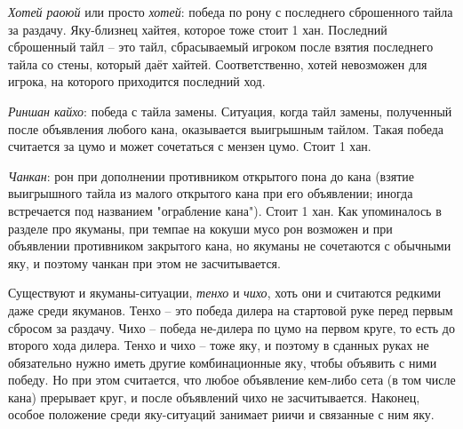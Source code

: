 \textit{Хотей раоюй} или просто \textit{хотей}: победа по рону с последнего сброшенного тайла за раздачу. Яку-близнец хайтея, которое тоже стоит 1 хан. Последний сброшенный тайл – это тайл, сбрасываемый игроком после взятия последнего тайла со стены, который даёт хайтей. Соответственно, хотей невозможен для игрока, на которого приходится последний ход.

\textit{Риншан кайхо}: победа с тайла замены. Ситуация, когда тайл замены, полученный после объявления любого кана, оказывается выигрышным тайлом. Такая победа считается за цумо и может сочетаться с мензен цумо. Стоит 1 хан. 

\textit{Чанкан}: рон при дополнении противником открытого пона до кана (взятие выигрышного тайла из малого открытого кана при его объявлении; иногда встречается под названием "ограбление кана"). Стоит 1 хан. Как упоминалось в разделе про якуманы, при темпае на кокуши мусо рон возможен и при объявлении противником закрытого кана, но якуманы не сочетаются с обычными яку, и поэтому чанкан при этом не засчитывается.

Существуют и якуманы-ситуации, \textit{тенхо} и \textit{чихо}, хоть они и считаются редкими даже среди якуманов. Тенхо – это победа дилера на стартовой руке перед первым сбросом за раздачу. Чихо – победа не-дилера по цумо на первом круге, то есть до второго хода дилера.  Тенхо и чихо – тоже яку, и поэтому в сданных руках не обязательно нужно иметь другие комбинационные яку, чтобы объявить с ними победу. Но при этом считается, что любое объявление кем-либо сета (в том числе кана) прерывает круг, и после объявлений чихо не засчитывается. Наконец, особое положение среди яку-ситуаций занимает риичи и связанные с ним яку. 
